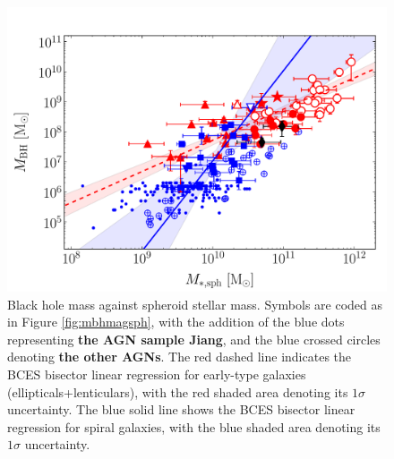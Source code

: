 \documentclass[preprint2]{emulateapj}
\begin{document}
\begin{figure}[h]
\begin{center}
\includegraphics[width=\columnwidth]{images/mbh_vs_mass_sph_agn.pdf}
\caption{Black hole mass against spheroid stellar mass. 
Symbols are coded as in Figure \ref{fig:mbhmagsph}, 
with the addition of the blue dots representing {\bf the AGN sample Jiang}, 
and the blue crossed circles denoting {\bf the other AGNs}.
The red dashed line indicates the BCES bisector linear regression for early-type galaxies (ellipticals+lenticulars), 
with the red shaded area denoting its $1\sigma$ uncertainty. 
The blue solid line shows the BCES bisector linear regression for spiral galaxies, 
with the blue shaded area denoting its $1\sigma$ uncertainty. }
\label{fig:mbhmasssph}
\end{center}
\end{figure}
\end{document}

